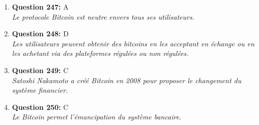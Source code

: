 \documentclass[12pt,a4paper]{article}
\begin{document}
\begin{enumerate}
\item \textbf{Question 247:} A
\\ \textit{Le protocole Bitcoin est neutre envers tous ses utilisateurs.}

\item \textbf{Question 248:} D
\\ \textit{Les utilisateurs peuvent obtenir des bitcoins en les acceptant en échange ou en les achetant via des plateformes régulées ou non régulées.}

\item \textbf{Question 249:} C
\\ \textit{Satoshi Nakamoto a créé Bitcoin en 2008 pour proposer le changement du système financier.}

\item \textbf{Question 250:} C
\\ \textit{Le Bitcoin permet l'émancipation du système bancaire.}


\end{enumerate}
\end{document}
